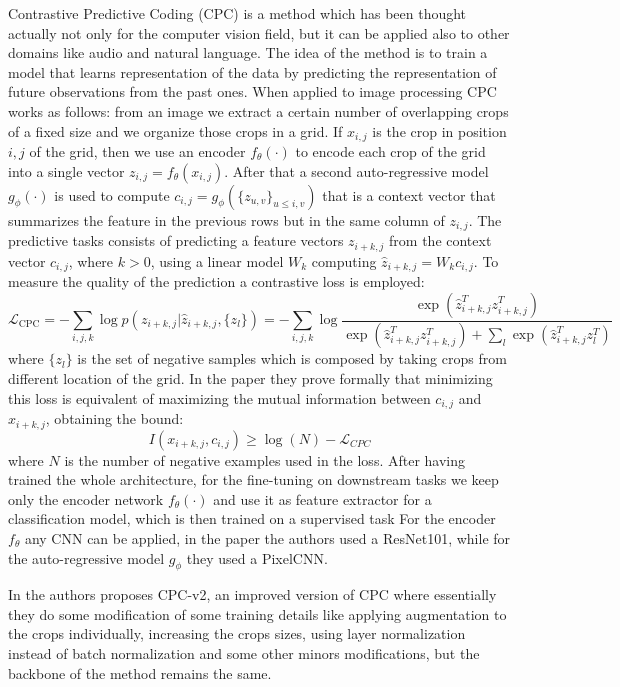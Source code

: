 Contrastive Predictive Coding (CPC) \cite{oord2018representation} is a method which has been thought actually not only for the computer vision field, but it can be applied also to other domains like audio and natural language. The idea of the method is to train a model that learns representation of the data by predicting the representation of future observations from the past ones. When applied to image processing CPC works as follows: from an image we extract a certain number of overlapping crops of a fixed size and we organize those crops in a grid. If $x_{i,j}$ is the crop in position $i, j$ of the grid, then we use an encoder $f_\theta(\cdot)$ to encode each crop of the grid into a single vector $z_{i,j} = f_\theta(x_{i,j})$. After that a second auto-regressive model $g_\phi(\cdot)$ is used to compute $c_{i,j} = g_\phi(\{z_{u,v}\}_{u\le i, v})$ that is a context vector that summarizes the feature in the previous rows but in the same column of $z_{i,j}$. The predictive tasks consists of predicting a feature vectors $z_{i+k,j}$ from the context vector $c_{i,j}$, where $k > 0$, using a linear model $W_k$ computing $\hat{z}_{i+k,j} = W_kc_{i,j}$. To measure the quality of the prediction a contrastive loss is employed:
\[ \mathcal{L}_{\text{CPC}} = -\sum_{i,j,k}\log p(z_{i+k,j}|\hat{z}_{i+k,j}, \{z_l\}) = -\sum_{i,j,k}\log \frac{\exp(\hat{z}^T_{i+k,j}z^T_{i+k,j})}{\exp(\hat{z}^T_{i+k,j}z^T_{i+k,j}) + \sum_l \exp(\hat{z}^T_{i+k,j}z^T_l)}\]
where $\{z_l\}$ is the set of negative samples which is composed by taking crops from different location of the grid. In the paper they prove formally that minimizing this loss is equivalent of maximizing the mutual information between $c_{i,j}$ and $x_{i+k,j}$, obtaining the bound:
\[ I(x_{i+k,j}, c_{i,j}) \ge \log(N) - \mathcal{L}_{CPC}\]
where $N$ is the number of negative examples used in the loss. After having trained the whole architecture, for the fine-tuning on downstream tasks we keep only the encoder network $f_\theta(\cdot)$ and use it as feature extractor for a classification model, which is then trained on a supervised task  For the encoder $f_\theta$ any CNN can be applied, in the paper the authors used a ResNet101, while for the auto-regressive model $g_\phi$ they used a PixelCNN.

In \cite{henaff2020data} the authors proposes CPC-v2, an improved version of CPC where essentially they do some modification of some training details like applying augmentation to the crops individually, increasing the crops sizes, using layer normalization instead of batch normalization and some other minors modifications, but the backbone of the method remains the same.